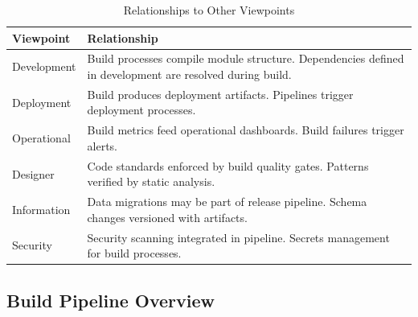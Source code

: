 \documentclass[11pt,letterpaper]{article}
\begin{document}
\begin{table}[H]
\centering
\caption{Relationships to Other Viewpoints}
\begin{tabular}{@{}L{3.5cm}L{10.5cm}@{}}
\toprule
\textbf{Viewpoint} & \textbf{Relationship} \\
\midrule
Development & Build processes compile module structure. Dependencies defined in development are resolved during build. \\
\addlinespace
Deployment & Build produces deployment artifacts. Pipelines trigger deployment processes. \\
\addlinespace
Operational & Build metrics feed operational dashboards. Build failures trigger alerts. \\
\addlinespace
Designer & Code standards enforced by build quality gates. Patterns verified by static analysis. \\
\addlinespace
Information & Data migrations may be part of release pipeline. Schema changes versioned with artifacts. \\
\addlinespace
Security & Security scanning integrated in pipeline. Secrets management for build processes. \\
\bottomrule
\end{tabular}
\end{table}

\subsection{Build Pipeline Overview}
\end{document}

